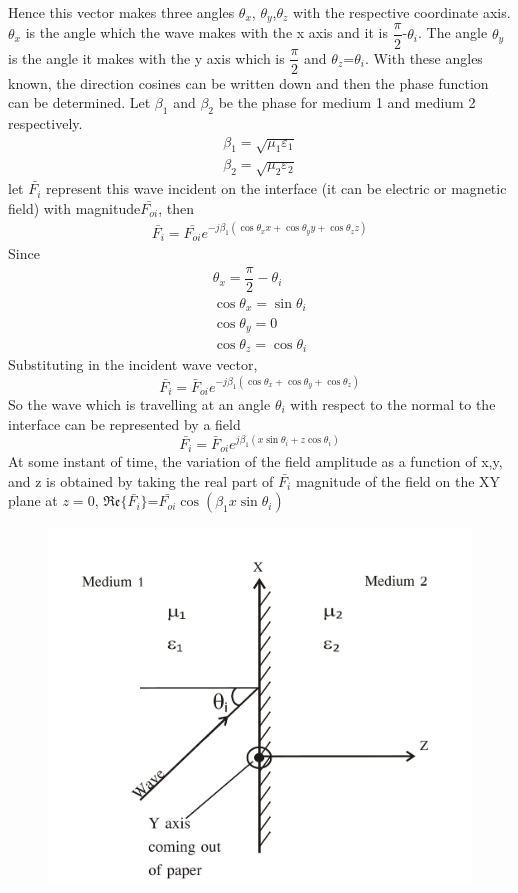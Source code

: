 Hence this vector makes three angles $\theta_x$, $\theta_y$,$\theta_z$ with the respective coordinate axis. $\theta_x$ is the angle which the wave makes with the x axis and it is $\dfrac{\pi}{2}$-$\theta_i$. The angle $\theta_y$ is the angle it makes with the y axis which is $\dfrac{\pi}{2}$ and $\theta_z$=$\theta_i$. With these angles known, the direction cosines can be written down and then the phase function can be determined. Let $\beta_1$ and $\beta_2$ be the phase for medium 1 and medium 2 respectively.
\begin{align*}
\beta_1=\sqrt{\mu_1\varepsilon_1}\\
\beta_2=\sqrt{\mu_2\varepsilon_2}
\end{align*}
let $\bar{F_i}$ represent this wave incident on the interface (it can be electric or magnetic field) with magnitude$\bar{F_{oi}}$, then
\begin{align*}
\bar{F_{i}}=\bar{F_{oi}}e^{-j\beta_1(\cos\theta_xx +\cos\theta_yy+\cos\theta_zz)}
\end{align*}
Since
\begin{align*}
\theta_x=\dfrac{\pi}{2}-\theta_i\\
\cos\theta _x=\sin \theta_i\\
\cos \theta_y=0\\
\cos\theta_z=\cos \theta_i
\end{align*}
Substituting in the incident wave vector,
$$\bar{F_i}=\bar{F}_{oi}e^{-j\beta_1(\cos \theta_x+\cos \theta_y+\cos \theta_z)}$$
So the wave  which is travelling at an angle $\theta_i$ with respect to the normal to the interface can be represented by a field
$$\bar{F_i}=\bar{F}_{oi}e^{j\beta_1(x\sin \theta_i+z\cos \theta_i)} $$
At some instant of time, the variation of the field amplitude as a function of x,y, and z is obtained by taking the real part of $\bar{F_i}$ magnitude of the field on the XY plane at $z=0$, $\mathfrak{Re}\{\bar{F_i}\}$=$\bar{F_{oi}}\cos (\beta_1x\sin \theta_i)$
\begin{figure}[h]
\centering
\includegraphics[width=.8\linewidth]{./graphics/group30b}
\caption{}
\label{fig:group30b}
\end{figure}

